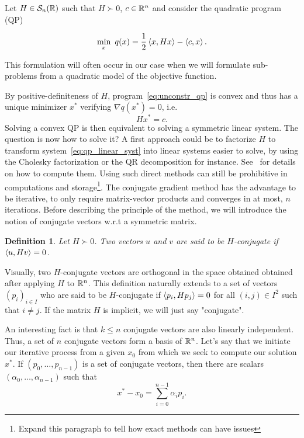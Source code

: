 \documentclass[10pt]{article}
\newtheorem{definition}[theorem]{Definition}
\numberwithin{equation}{section}
\begin{document}
	Let $H \in {\mathcal{S}}_n({\mathbb{R}})$ such that $H \succ 0$, $c \in {\mathbb{R}}^n$ and consider the quadratic program (QP)
	
	\begin{equation}\label{eq:unconstr_qp}
		\min_x \ q(x) = \dfrac{1}{2} \left\langle {x} , {Hx} \right\rangle - \left\langle {c} , {x} \right\rangle.
	\end{equation}
	
	This formulation will often occur in our case when we will formulate sub-problems from a quadratic model of the objective function.
	
	
	By positive-definiteness of $H$, program~\eqref{eq:unconstr_qp} is convex and thus has a unique minimizer $x^*$ verifying $\nabla q(x^*)=0$, i.e.
	\begin{equation}\label{eq:qp_linear_syst}
		Hx^* = c.
	\end{equation}
	Solving a convex QP is then equivalent to solving a symmetric linear system. The question is now how to solve it? A first approach could be to factorize $H$ to transform system~\eqref{eq:qp_linear_syst} into linear systems easier to solve, by using the Cholesky factorization or the QR decomposition for instance. See~\cite{golubvanloan:2013} for details on how to compute them. Using such direct methods can  still be prohibitive in computations and storage\footnote{Expand this paragraph to tell how exact methods can have issues}. The conjugate gradient method has the advantage to be iterative, to only require matrix-vector products and converges in at most, $n$ iterations. Before describing the principle of the method, we will introduce the notion of conjugate vectors w.r.t a symmetric matrix.
	
	\begin{definition}\label{def:conjugate_vectors}
		Let $H \succ 0$. Two vectors $u$ and $v$ are said to be $H$-conjugate if $\left\langle {u} , {Hv} \right\rangle=0$.
	\end{definition} 
	
	Visually, two $H$-conjugate vectors are orthogonal in the space obtained obtained after applying $H$ to ${\mathbb{R}}^n$. This definition naturally extends to a set of vectors $(p_i)_{i\in I}$ who are said to be $H$-conjugate if $\left\langle {p_i} , {Hp_j} \right\rangle=0$ for all $(i,j) \in I^2$ such that $i\neq j$. If the matrix $H$ is implicit, we will just say "conjugate". 
	
	An interesting fact is that $k\le n$ conjugate vectors are also linearly independent. Thus, a set of $n$ conjugate vectors form a basis of ${\mathbb{R}}^n$. Let's say that we initiate our iterative process from a given $x_0$ from which we seek to compute our solution $x^*$. If $(p_0,\ldots,p_{n-1})$ is a set of conjugate vectors, then there are scalars $(\alpha_0,\ldots,\alpha_{n-1})$ such that
	\[ x^*-x_0 = \sum_{i=0}^{n-1} \alpha_i p_i.\]
	
\end{document}
